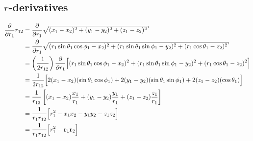 
\subsection*{$r$-derivatives}
\begin{align*}
    \frac{\partial}{\partial r_1} r_{12} 
    &= \frac{\partial}{\partial r_1} \sqrt{(x_1 - x_2)^2 + (y_1 - y_2)^2 + (z_1 - z_2)^2} \\
    &= \frac{\partial}{\partial r_1} \sqrt{(r_1\sin\theta_1\cos\phi_1 - x_2)^2 + (r_1\sin\theta_1\sin\phi_1 - y_2)^2 + (r_1\cos\theta_1 - z_2)^2} \\
    &= \left(\frac{1}{2r_{12}}\right) \frac{\partial}{\partial r_1} \Big[ (r_1\sin\theta_1\cos\phi_1 - x_2)^2 + (r_1\sin\theta_1\sin\phi_1 - y_2)^2 + (r_1\cos\theta_1 - z_2)^2 \Big] \\
    &= \frac{1}{2r_{12}} \Big[ 2(x_1 - x_2)(\sin\theta_1\cos\phi_1) + 2(y_1 - y_2)(\sin\theta_1\sin\phi_1) + 2(z_1 - z_2)(\cos\theta_1) \Big] \\
    &= \frac{1}{r_{12}} \left[ (x_1 - x_2)\frac{x_1}{r_1} + (y_1 - y_2)\frac{y_1}{r_1} + (z_1 - z_2)\frac{z_1}{r_1} \right] \\
    &= \frac{1}{r_1 r_{12}} \Big[ r_1^2 - x_1x_2 - y_1y_2 - z_1z_2 \Big] \\
    &= \frac{1}{r_1 r_{12}} \Big[ r_1^2 - \bvec r_1 \bvec r_2 \Big] \\
\end{align*}

